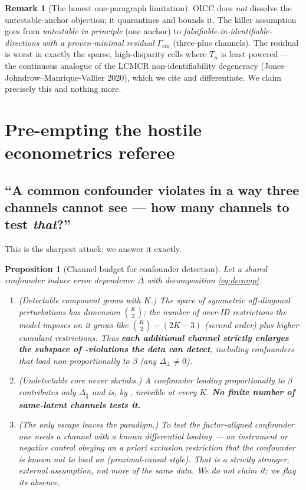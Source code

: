 \documentclass[11pt]{article}
\newtheorem{proposition}{Proposition}
\theoremstyle{definition}
\newtheorem{remark}{Remark}
\newcommand{\Gcm}{\Gamma_{\mathrm{cm}}}
\newcommand{\Dperp}{\Delta_{\perp}}
\newcommand{\Dpar}{\Delta_{\parallel}}
\begin{document}
\begin{remark}[The honest one-paragraph limitation]
OICC does \emph{not} dissolve the untestable-anchor objection; it quarantines
and bounds it. The killer assumption goes from \emph{untestable in principle}
(one anchor) to \emph{falsifiable-in-identifiable-directions with a
proven-minimal residual $\Gcm$} (three-plus channels). The residual is worst in
exactly the sparse, high-disparity cells where $T_n$ is least powered --- the
continuous analogue of the LCMCR non-identifiability degeneracy
(Jones--Johndrow--Manrique-Vallier 2020), which we cite and differentiate. We
claim precisely this and nothing more.
\end{remark}

\section{Pre-empting the hostile econometrics referee}\label{sec:referee}

\subsection{``A common confounder violates  in a way three channels
cannot see --- how many channels to test \emph{that}?''}\label{sec:confounder}

This is the sharpest attack; we answer it exactly.

\begin{proposition}[Channel budget for confounder detection]\label{prop:budget}
Let a shared confounder induce error dependence $\Delta$ with decomposition
\eqref{eq:decomp}.
\begin{enumerate}[label=(\alph*),leftmargin=2.2em]
\item \emph{(Detectable component grows with $K$.)} The space of symmetric
off-diagonal perturbations has dimension $\binom K2$; the number of over-ID
restrictions the model imposes on it grows like $\binom K2-(2K-3)$ (second
order) plus higher-cumulant restrictions. Thus \textbf{each additional channel
strictly enlarges the subspace of -violations the data can detect},
including confounders that load \emph{non-proportionally} to $\beta$ (any
$\Dperp\neq0$).
\item \emph{(Undetectable core never shrinks.)} A confounder loading
\emph{proportionally} to $\beta$ contributes only $\Dpar$ and is, by
, invisible at \emph{every} $K$. \textbf{No finite number
of same-latent channels tests it.}
\item \emph{(The only escape leaves the paradigm.)} To test the
factor-aligned confounder one needs a channel with a \emph{known differential
loading} --- an instrument or negative control obeying an a priori exclusion
restriction that the confounder is known \emph{not} to load on (proximal-causal
style). That is a strictly stronger, external assumption, not more of the same
data. We do not claim it; we flag its absence.
\end{enumerate}
\end{proposition}
\end{document}
